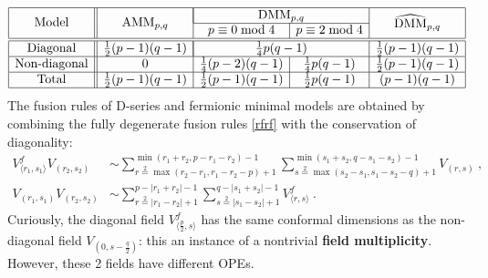 \documentclass[12pt, a4paper]{article}
\newcommand{\myindex}[1]{\textbf{\boldmath #1}}
\begin{document}
\begin{align}
 \begin{array}{|c||c|c|c|c|}
 \hline 
  \multirow{2}{*}{Model} & \multirow{2}{*}{AMM$_{p,q}$} & \multicolumn{2}{|c|}{\text{DMM}_{p,q}} 
   & \multirow{2}{*}{$\widehat{\text{DMM}}_{p,q}$}
  \\
  \cline{3-4}
  & & p\equiv 0\bmod 4 & p\equiv 2\bmod 4 & 
  \\
  \hline \hline 
  \text{Diagonal} & \frac12(p-1)(q-1) & \multicolumn{2}{|c|}{\frac14 p(q-1)} & \frac12 (p-1)(q-1) 
  \\
  \hline 
  \text{Non-diagonal} & 0  & \frac14(p-2)(q-1) &
  \frac14p(q-1) 
  & \frac12 (p-1)(q-1) 
  \\
  \hline 
  \text{Total} & \frac12(p-1)(q-1) & 
   \frac12(p-1)(q-1) &
  \frac12 p(q-1) & (p-1)(q-1)
  \\
  \hline 
 \end{array}
\end{align}
The fusion rules of D-series and fermionic minimal models are obtained by combining the fully degenerate fusion rules \eqref{rfrf} with the conservation of diagonality:
\begin{subequations}
\begin{align}
 V^f_{\langle r_1,s_1\rangle}V_{(r_2,s_2)} &\sim \sum_{r\overset{2}{=}\max(r_2-r_1,r_1-r_2-p)+1}^{\min(r_1+r_2,p-r_1-r_2)-1} \sum_{s\overset{2}{=}\max(s_2-s_1,s_1-s_2-q)+1}^{\min(s_1+s_2,q-s_1-s_2)-1} V_{(r,s)} \ ,
 \label{vfvn}
 \\
 V_{(r_1,s_1)} V_{(r_2,s_2)} & \sim \sum_{r\overset{2}{=}|r_1-r_2|+1}^{p-|r_1+r_2|-1} \sum_{s\overset{2}{=}|s_1-s_2|+1}^{q-|s_1+s_2|-1} V^f_{\langle r,s\rangle}\ . 
 \label{vnvn}
\end{align}
\end{subequations}
Curiously, the diagonal field $V^f_{\langle \frac{p}{2}, s\rangle}$ has the same conformal dimensions as the non-diagonal field $V_{(0,s-\frac{q}{2})}$: this an instance of a nontrivial \myindex{field multiplicity}. However, these 2 fields have different OPEs. 
\end{document}
